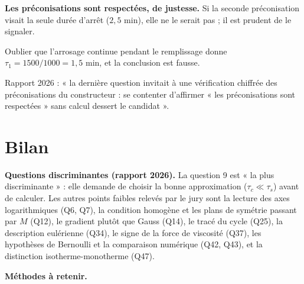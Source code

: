 \documentclass[11pt,a4paper]{article}
\begin{document}
\textbf{Les préconisations sont respectées, de justesse.} Si la seconde préconisation visait la seule durée d'arrêt (\(2{,}5\) min), elle ne le serait pas ; il est prudent de le signaler.

\begin{piege}

Oublier que l'arrosage continue pendant le remplissage donne \(\tau_1=1500/1000=1{,}5\) min, et la conclusion est fausse.

\end{piege}

\begin{jury}

Rapport 2026 : « la dernière question invitait à une vérification chiffrée des préconisations du constructeur : se contenter d'affirmer « les préconisations sont respectées » sans calcul dessert le candidat ».

\end{jury}

\hypertarget{bilan}{%
\section{Bilan}\label{bilan}}

\textbf{Questions discriminantes (rapport 2026).} La question 9 est « la plus discriminante » : elle demande de choisir la bonne approximation (\(\tau_c\ll\tau_s\)) avant de calculer. Les autres points faibles relevés par le jury sont la lecture des axes logarithmiques (Q6, Q7), la condition homogène et les plans de symétrie passant par \(M\) (Q12), le gradient plutôt que Gauss (Q14), le tracé du cycle (Q25), la description eulérienne (Q34), le signe de la force de viscosité (Q37), les hypothèses de Bernoulli et la comparaison numérique (Q42, Q43), et la distinction isotherme-monotherme (Q47).

\textbf{Méthodes à retenir.}
\end{document}
